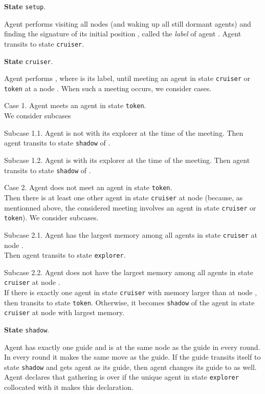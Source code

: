 \documentclass[11pt]{article}
\begin{document}
  \vspace*{0.2cm}
 
  \noindent
 {\bf State} {\tt setup}.
 
{Agent  performs  visiting all nodes (and waking up all still dormant agents) and finding the signature of its initial position , called the {\em label} of agent .}
 Agent   transits to state  {\tt cruiser}.
 
  \vspace*{0.2cm}
 
  \noindent
 {\bf State} {\tt cruiser}.
 
 Agent  performs , where  is its label, until meeting an agent in state  {\tt cruiser} or {\tt token} at a node . 
 {When such a meeting occurs, we consider  cases.}

  \noindent
 Case 1.
 Agent   meets an agent  in state {\tt token}.\\
{We consider  subcases}

{Subcase 1.1.}
{Agent  is not with its explorer at the time of the meeting. Then agent  transits to state {\tt shadow} of .}

{Subcase 1.2.}
 {Agent  is with its explorer  at the time of the meeting. Then agent  transits to state {\tt shadow} of .}
 
 
  \noindent
 Case 2.
 Agent  does not meet an agent  in state {\tt token}.\\ 
 Then there is at least one other agent in state {\tt cruiser} at node  {(because, as mentionned above, the considered meeting involves an agent in state {\tt cruiser} or {\tt token})}. {We consider  subcases.}
 
 Subcase 2.1.
 Agent   has the largest memory among all agents in state  {\tt cruiser} at node .\\
 Then agent   transits to state {\tt explorer}.
 
 Subcase 2.2.
 Agent   does not have the largest memory among all agents in state  {\tt cruiser} at node .\\
 If there is exactly one agent  in state {\tt cruiser}  with memory larger than  at node , then  transits to state {\tt token}.
 Otherwise, it becomes {\tt shadow} of the agent in state  {\tt cruiser} at node  with largest memory.
 
  \vspace*{0.2cm}
 
 \noindent
 {\bf State}  {\tt shadow}.
 
 Agent  has exactly one guide and is at  the same node as the guide in every round. In every round it makes the same move as the guide.
 If the guide  transits itself to state  {\tt shadow} and gets agent  as its guide, then agent  changes its guide to  as well. 
 Agent  declares that gathering is over if the unique agent in state {\tt explorer} collocated with it makes this declaration.  
 
\end{document}
